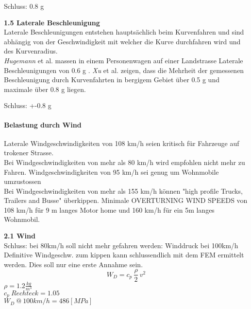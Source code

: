 \begin{description}
  Schluss: 0.8 g

  \item \textbf{1.5 Laterale Beschleunigung}\\
  Laterale Beschleunigungen entstehen hauptsächlich beim Kurvenfahren und sind abhängig von der Geschwindigkeit mit welcher die Kurve durchfahren wird und des Kurvenradius.\\
  \emph{Hugemann} et al. massen in einem Personenwagen auf einer Landstrasse Laterale Beschleunigungen von 0.6 g .\cite{Kurv.1} \emph{Xu} et al. zeigen, dass die Mehrheit der gemessenen Beschleunigung durch Kurvenfahrten in bergigem Gebiet über 0.5 g und maximale über 0.8 g liegen. \cite{Kurv.2}

  Schluss: +-0.8 g\\
\end{description}

\paragraph{Belastung durch Wind}

\cite{Wind.1} Laterale Windgeschwindigkeiten von 108 km/h seien kritisch für Fahrzeuge auf trokener Strasse.\\
\cite{Wind.2} Bei Windgeschwindigkeiten von mehr als 80 km/h wird empfohlen nicht mehr zu Fahren. Windgeschwindigkeiten von 95 km/h sei genug um Wohnmobile umzustossen\\
\cite{Wind.3} Bei Windgeschwindigkeiten von mehr als 155 km/h können "high profile Trucks, Trailers and Busse" überkippen. Minimale OVERTURNING WIND SPEEDS von 108 km/h für 9 m langes Motor home und 160 km/h für ein 5m langes Wohnmobil.

\begin{description}
  \item \textbf{2.1 Wind}\\
  Schluss: bei 80km/h soll nicht mehr gefahren werden: Winddruck bei 100km/h\\
  Definitive Windgeschw. zum kippen kann schlussendlich mit dem FEM ermittelt werden. Dies soll nur eine erste Annahme sein.
  \begin{equation}
    \label{Winddruck}
    W_D = c_p \: \frac{\rho}{2}\: v^2
  \end{equation}
  $\rho = 1.2 \frac{kg}{m^3}$\\
  $c_p \: Rechteck = 1.05$\\

  $W_D \:@\: 100 km/h= 486 \left[MPa \right]$
\end{description}

